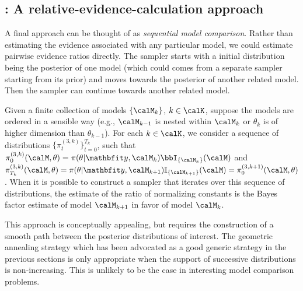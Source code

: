 \subsection{\smc[3]: A relative-evidence-calculation approach}
\label{sub:smc3: A relative-evidence-calculation approach}

A final approach can be thought of as \emph{sequential model comparison}.
Rather than estimating the evidence associated with any particular model, we
could estimate pairwise evidence ratios directly. The \smc sampler starts with
a initial distribution being the posterior of one model (which could comes
from a separate \smc sampler starting from its prior) and moves towards the
posterior of another related model. Then the sampler can continue towards
another related model.

Given a finite collection of models $\{\calM_k\}$, $k\in\calK$, suppose the
models are ordered in a sensible way (e.g., $\calM_{k-1}$ is nested within
$\calM_k$ or $\theta_k$ is of higher dimension than $\theta_{k-1}$). For each
$k\in\calK$, we consider a sequence of distributions
$\{\pi_t^{(3,k)}\}_{t=0}^{T_k}$, such that $\pi_0^{(3,k)}(\calM,\theta) =
\pi(\theta|\data,\calM_k) \bbI_{\{\calM_k\}}(\calM)$ and
$\pi_{T_k}^{(3,k)}(\calM,\theta) = \pi(\theta|\data,\calM_{k+1})
\mathbb{I}_{\{\calM_{k+1}\}}(\calM) = \pi_{0}^{(3,k+1)}(\calM,\theta)$. When
it is possible to construct a \smc sampler that iterates over this sequence of
distributions, the estimate of the ratio of normalizing constants is the Bayes
factor estimate of model $\calM_{k+1}$ in favor of model $\calM_k$.

This approach is conceptually appealing, but requires the construction of a
smooth path between the posterior distributions of interest. The geometric
annealing strategy which has been advocated as a good generic strategy in the
previous sections is only appropriate when the support of successive
distributions is non-increasing. This is unlikely to be the case in
interesting model comparison problems.

